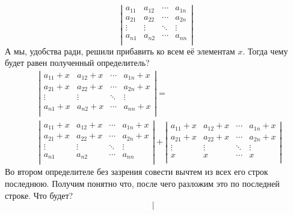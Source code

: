 \documentclass{article}
\begin{document}
\begin{enumerate}
        $$
        \left|\begin{matrix}
            a_{11} & a_{12} & \cdots & a_{1n}\\
            a_{21} & a_{22} & \cdots & a_{2n}\\
            \vdots & \vdots & \ddots & \vdots\\
            a_{n1} & a_{n2} & \cdots & a_{nn}\\
        \end{matrix}\right|
        $$
        А мы, удобства ради, решили прибавить ко всем её элементам $x$. Тогда чему будет равен полученный определитель?
        \[
        \begin{aligned}
            &\left|\begin{matrix}
                a_{11}+x & a_{12}+x & \cdots & a_{1n}+x\\
                a_{21}+x & a_{22}+x & \cdots & a_{2n}+x\\
                \vdots & \vdots & \ddots & \vdots\\
                a_{n1}+x & a_{n2}+x & \cdots & a_{nn}+x\\
            \end{matrix}\right|=\\
            &\left|\begin{matrix}
                a_{11}+x & a_{12}+x & \cdots & a_{1n}+x\\
                a_{21}+x & a_{22}+x & \cdots & a_{2n}+x\\
                \vdots & \vdots & \ddots & \vdots\\
                a_{n1} & a_{n2} & \cdots & a_{nn}\\
            \end{matrix}\right|+
            \left|\begin{matrix}
                a_{11}+x & a_{12}+x & \cdots & a_{1n}+x\\
                a_{21}+x & a_{22}+x & \cdots & a_{2n}+x\\
                \vdots & \vdots & \ddots & \vdots\\
                x & x & \cdots & x\\
            \end{matrix}\right|
        \end{aligned}
        \]
        Во втором определителе без зазрения совести вычтем из всех его строк последнюю. Получим понятно что, после чего разложим это по последней строке. Что будет?
        $$
        \left|\begin{matrix}

\end{matrix}$$
\end{enumerate}
\end{document}
